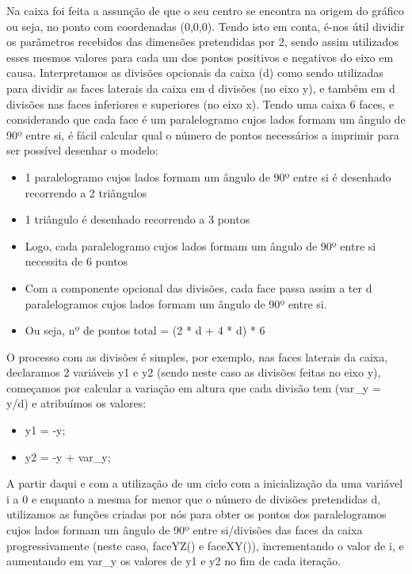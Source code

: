 \documentclass{article}
\begin{document}
Na caixa foi feita a assunção de que o seu centro se encontra na origem do gráfico ou seja, no ponto com coordenadas (0,0,0).
Tendo isto em conta, é-nos útil dividir os parâmetros recebidos das dimensões pretendidas por 2, sendo assim utilizados esses mesmos valores para cada um dos pontos positivos e negativos do eixo em causa.
Interpretamos as divisões opcionais da caixa (d) como sendo utilizadas para dividir as faces laterais da caixa em d divisões (no eixo y), e também em d divisões nas faces inferiores e superiores (no eixo x).
Tendo uma caixa 6 faces, e considerando que cada face é um paralelogramo cujos lados formam um ângulo de 90º entre si, é fácil calcular qual o número de pontos necessários a imprimir para ser possível desenhar o modelo:
\begin{itemize}
    \item 1 paralelogramo cujos lados formam um ângulo de 90º entre si é desenhado recorrendo a 2 triângulos
    \item 1 triângulo é desenhado recorrendo a 3 pontos
    \item Logo, cada paralelogramo cujos lados formam um ângulo de 90º entre si necessita de 6 pontos
    \item Com a componente opcional das divisões, cada face passa assim a ter d paralelogramos cujos lados formam um ângulo de 90º entre si.
    \item Ou seja, nº de pontos total = (2 * d + 4 * d) * 6
\end{itemize}
O processo com as divisões é simples, por exemplo, nas faces laterais da caixa, declaramos 2 variáveis y1 e y2 (sendo neste caso as divisões feitas no eixo y), começamos por calcular a variação em altura que cada divisão tem (var\_y = y/d) e atribuímos os valores:
\begin{itemize}
    \item y1 = -y;
    \item y2 = -y + var\_y;
\end{itemize}
A partir daqui e com a utilização de um ciclo com a inicialização da uma variável i a 0 e enquanto a mesma for menor que o número de divisões pretendidas d, utilizamos as funções criadas por nós para obter os pontos dos paralelogramos cujos lados formam um ângulo de 90º entre si/divisões das faces da caixa progressivamente (neste caso, faceYZ() e faceXY()), incrementando o valor de i, e aumentando em var\_y os valores de y1 e y2 no fim de cada iteração.
\end{document}
